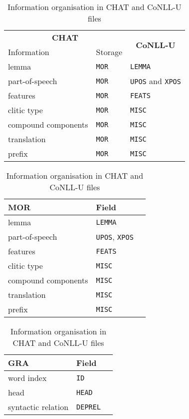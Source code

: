 \begin{table}[h!]
\caption {Information organisation in CHAT and CoNLL-U files} \label{tab:info}
\centering
\begin{tabularx}{\linewidth}{@{}Xll@{}}
\toprule
\multicolumn{2}{c}{\textbf{CHAT}}& \multicolumn{1}{c}{\multirow{2}{*}{\textbf{CoNLL-U}}}\\
\cmidrule(lr){1-2}
Information & Storage &\multicolumn{1}{l}{}\\\midrule
lemma & \texttt{MOR}& \texttt{LEMMA} \\
part-of-speech & \texttt{MOR}& \texttt{UPOS} and \texttt{XPOS}\\
features & \texttt{MOR}& \texttt{FEATS} \\\addlinespace
clitic type & \texttt{MOR} & \texttt{MISC} \\
compound components & \texttt{MOR} & \texttt{MISC} \\
translation & \texttt{MOR} & \texttt{MISC} \\
prefix & \texttt{MOR} & \texttt{MISC} \\\bottomrule
\end{tabularx}
\end{table}


\begin{table}[h!]
\caption {Information organisation in CHAT and CoNLL-U files} \label{tab:info}
\centering
\begin{tabularx}{\linewidth}{@{}Xll@{}}
\toprule
\textbf{MOR} & \textbf{Field}\\\midrule
lemma & \texttt{LEMMA} \\
part-of-speech & \texttt{UPOS}, \texttt{XPOS}\\
features & \texttt{FEATS} \\\addlinespace
clitic type & \texttt{MISC} \\
compound components & \texttt{MISC} \\
translation & \texttt{MISC} \\
prefix & \texttt{MISC} \\\bottomrule
\end{tabularx}
\end{table}


\begin{table}[h!]
\caption {Information organisation in CHAT and CoNLL-U files} \label{tab:info}
\centering
\begin{tabularx}{\linewidth}{@{}Xll@{}}
\toprule
\textbf{GRA} & \textbf{Field}\\\midrule
word index & \texttt{ID} \\
head & \texttt{HEAD}\\
syntactic relation & \texttt{DEPREL} \\\bottomrule
\end{tabularx}
\end{table}
